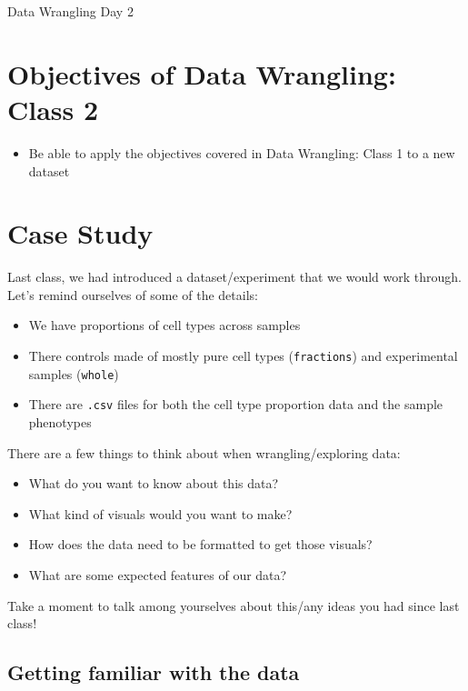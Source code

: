 \documentclass[
  letterpaper,
  DIV=11,
  numbers=noendperiod]{scrreprt}
\providecommand{\tightlist}{%
  \setlength{\itemsep}{0pt}\setlength{\parskip}{0pt}}\usepackage{longtable,booktabs,array}
\begin{document}
Data Wrangling Day 2

\hfill\break

\section{Objectives of Data Wrangling: Class
2}\label{objectives-of-data-wrangling-class-2}

\begin{itemize}
\tightlist
\item
  Be able to apply the objectives covered in Data Wrangling: Class 1 to
  a new dataset
\end{itemize}

\section{Case Study}\label{case-study}

Last class, we had introduced a dataset/experiment that we would work
through. Let's remind ourselves of some of the details:

\begin{itemize}
\tightlist
\item
  We have proportions of cell types across samples
\item
  There controls made of mostly pure cell types (\texttt{fractions}) and
  experimental samples (\texttt{whole})
\item
  There are \texttt{.csv} files for both the cell type proportion data
  and the sample phenotypes
\end{itemize}

There are a few things to think about when wrangling/exploring data:

\begin{itemize}
\tightlist
\item
  What do you want to know about this data?
\item
  What kind of visuals would you want to make?
\item
  How does the data need to be formatted to get those visuals?
\item
  What are some expected features of our data?
\end{itemize}

Take a moment to talk among yourselves about this/any ideas you had
since last class!

\subsection{Getting familiar with the
data}\label{getting-familiar-with-the-data-1}
\end{document}
